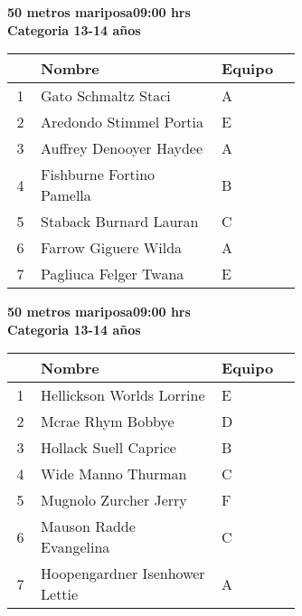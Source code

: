 \begin{minipage}{0.95\linewidth}\vspace{0.5cm} 
\begin{flushleft}
\textbf{
\hspace{-0.15cm}50 metros mariposa\hspace{1.5cm}09:00 hrs \\Categoria 13-14 años}\vspace{-0.2cm} 
\end{flushleft}
\begin{tabular}{cp{0.63\linewidth}l}
\hline
& \textbf{Nombre} & \textbf{Equipo} \\ \hline
1 & Gato Schmaltz Staci & A \\ 
2 & Aredondo Stimmel Portia & E \\ 
3 & Auffrey Denooyer Haydee & A \\ 
4 & Fishburne Fortino Pamella & B \\ 
5 & Staback Burnard Lauran & C \\ 
6 & Farrow Giguere Wilda & A \\ 
7 & Pagliuca Felger Twana & E \\ 
\end{tabular}
\end{minipage}
\begin{minipage}{0.95\linewidth}\vspace{0.5cm} 
\begin{flushleft}
\textbf{
\hspace{-0.15cm}50 metros mariposa\hspace{1.5cm}09:00 hrs \\Categoria 13-14 años}\vspace{-0.2cm} 
\end{flushleft}
\begin{tabular}{cp{0.63\linewidth}l}
\hline
& \textbf{Nombre} & \textbf{Equipo} \\ \hline
1 & Hellickson Worlds Lorrine & E \\ 
2 & Mcrae Rhym Bobbye & D \\ 
3 & Hollack Suell Caprice & B \\ 
4 & Wide Manno Thurman & C \\ 
5 & Mugnolo Zurcher Jerry & F \\ 
6 & Mauson Radde Evangelina & C \\ 
7 & Hoopengardner Isenhower Lettie & A \\ 
\end{tabular}
\end{minipage}
